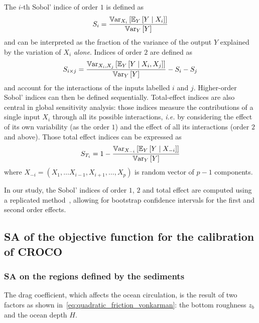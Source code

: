 \documentclass[../../Main_ManuscritThese.tex]{subfiles}
\newcommand{\zob}{z_b}
\begin{document}
The $i$-th Sobol' indice of order $1$ is defined
as~\cite{sobol_sensitivity_1993,sobol_global_2001}
\begin{equation}
  S_i = \frac{\mathbb{V}\mathrm{ar}_{X_i}\left[\mathbb{E}_{Y}\left[Y \mid X_i\right]\right]}{\mathbb{V}\mathrm{ar}_{Y}\left[Y\right]}
\end{equation}
and can be interpreted as the fraction of the variance of the output
$Y$ explained by the variation of $X_i$ \emph{alone}. Indices of
order $2$ are defined as
\begin{equation}
  S_{i\times j} = \frac{\mathbb{V}\mathrm{ar}_{X_i, X_j}\left[\mathbb{E}_{Y}\left[Y \mid X_i, X_j\right]\right]}{\mathbb{V}\mathrm{ar}_{Y}\left[Y\right]} - S_i -S_j
\end{equation}
and account for the interactions of the inputs labelled $i$ and $j$.
Higher-order Sobol' indices can then be defined
sequentially. Total-effect indices are also central in global
sensitivity analysis: those indices measure the contributions of a
single input $X_i$ through all its possible interactions,
\textit{i.e.} by considering the effect of its own variability (as the
order $1$) and the effect of all its interactions (order $2$ and
above). Those total effect indices can be expressed as
\begin{equation}
  S_{T_i} = 1 - \frac{\mathbb{V}\mathrm{ar}_{X_{-i}}\left[\mathbb{E}_{Y}\left[Y \mid X_{-i}\right]\right]}{\mathbb{V}\mathrm{ar}_{Y}\left[Y\right]}
\end{equation}
where $X_{-i} = (X_1,\dots X_{i-1},X_{i+1},\dots,X_p)$ is random vector of $p-1$ components.

In our study, the Sobol' indices of order $1$, $2$ and total effect
are computed using a replicated
method~\cite{gilquin_making_2019,gilquin_echantillonnages_2016},
allowing for bootstrap confidence intervals for the first and second
order effects.

\subsection{SA of the objective function for the calibration of CROCO}
\subsubsection{SA on the regions defined by the sediments}
The drag coefficient, which affects the ocean circulation, is the
result of two factors as shown
in~\cref{eq:quadratic_friction_vonkarman}: the bottom roughness
$\zob$ and the ocean depth $H$.
\end{document}
